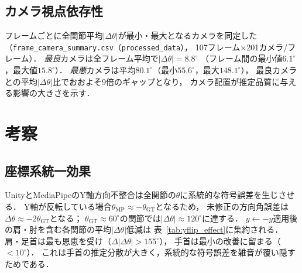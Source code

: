 \documentclass[fleqn]{ieej}
\begin{document}
\subsection{カメラ視点依存性}
\label{subsec:camera_dep}

フレームごとに全関節平均$|\Delta\theta|$が最小・最大となるカメラを同定した
（\texttt{frame\_camera\_summary.csv}（\texttt{processed\_data}），
107フレーム$\times$201カメラ/フレーム）．
\emph{最良}カメラは全フレーム平均で$|\Delta\theta|=8.8^{\circ}$
（フレーム間の最小値$6.1^{\circ}$，最大値$15.8^{\circ}$）．
\emph{最悪}カメラは平均$80.1^{\circ}$（最小$55.6^{\circ}$，最大$148.1^{\circ}$），
最良カメラとの平均$|\Delta\theta|$比でおおよそ9倍のギャップとなり，
カメラ配置が推定品質に与える影響の大きさを示す．

\section{考察}

\subsection{座標系統一効果}

UnityとMediaPipeのY軸方向不整合は全関節の$\theta$に系統的な符号誤差を生じさせる．
Y軸が反転している場合$\theta_{\text{MP}} \approx -\theta_{\text{GT}}$となるため，
未修正の方向角誤差は$\Delta\theta \approx -2\theta_{\text{GT}}$となる；
$\theta_{\text{GT}} \approx 60^{\circ}$の関節では$|\Delta\theta| \approx 120^{\circ}$に達する．
$y \leftarrow -y$適用後の肩・肘を含む各関節の平均$|\Delta\theta|$低減は
表~\ref{tab:yflip_effect}に集約される\cite{mediapipe_coord_issue}．
肩・足首は最も恩恵を受け（$\Delta|\Delta\theta|>155^{\circ}$），
手首は最小の改善に留まる（$<10^{\circ}$）．
これは手首の推定分散が大きく，系統的な符号誤差を雑音が覆い隠すためである．
\end{document}
